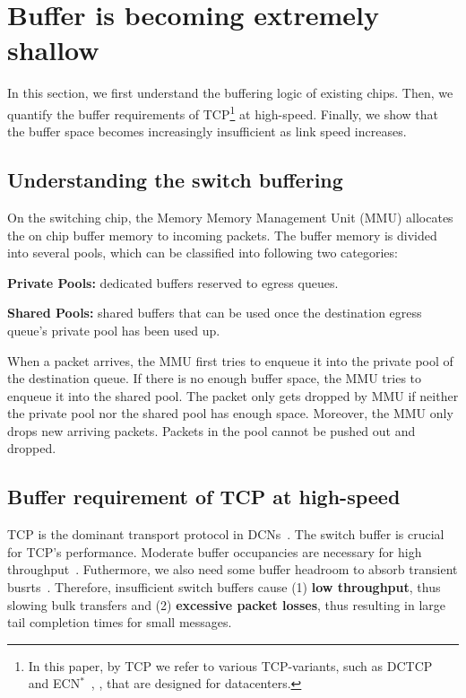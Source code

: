 \section{Buffer is becoming extremely\\ shallow}\label{sec:background}
\vspace{-1mm}
In this section, we first understand the buffering logic of existing chips. Then, we quantify the buffer requirements of TCP\footnote{In this paper, by TCP we refer to various TCP-variants, such as DCTCP~\cite{dctcp} and ECN$^{*}$~\cite{tuning}, \etc, that are designed for datacenters.} at high-speed. Finally, we show that the buffer space becomes increasingly insufficient as link speed increases.

\subsection{Understanding the switch buffering}
On the switching chip, the Memory Memory Management Unit (MMU) allocates the on chip buffer memory to incoming packets. The buffer memory is divided into several pools, which can be classified into following two categories:
\begin{ecompact}
\item \textbf{Private Pools:} dedicated buffers reserved to egress queues.
\item \textbf{Shared Pools:} shared buffers that can be used once the destination egress queue's private pool has been used up.
\end{ecompact}

When a packet arrives, the MMU first tries to enqueue it into the private pool of the destination queue. If there is no enough buffer space, the MMU tries to enqueue it into the shared pool. The packet only gets dropped by MMU if neither the private pool nor the shared pool has enough space. Moreover, the MMU only drops new arriving packets. Packets in the pool cannot be pushed out and dropped.

\subsection{Buffer requirement of TCP at high-speed}\label{subsec:buffer_requirement_high_speed}
TCP is the dominant transport protocol in DCNs~\cite{dctcp}. The switch buffer is crucial for TCP's performance. Moderate buffer occupancies are necessary for high throughput~\cite{sizing}. Futhermore, we also need some buffer headroom to absorb transient busrts~\cite{dctcp}. Therefore, insufficient switch buffers cause (1) \textbf{low throughput}, thus slowing bulk transfers and (2) \textbf{excessive packet losses}, thus resulting in large tail completion times for small messages.

